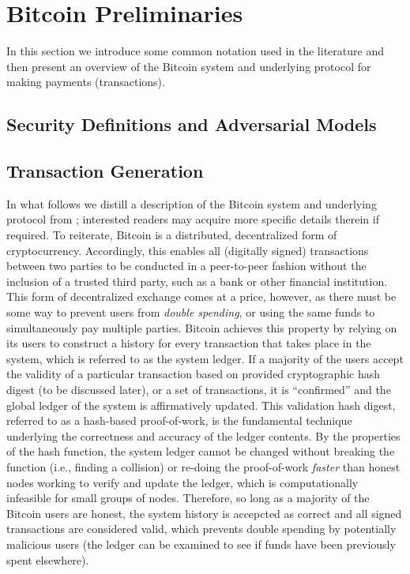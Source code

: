 \section{Bitcoin Preliminaries}

In this section we introduce some common notation used in the literature and then present an overview of the Bitcoin system and underlying protocol for making payments (transactions). 

\subsection{Security Definitions and Adversarial Models}

\subsection{Transaction Generation}

In what follows we distill a description of the Bitcoin system and underlying protocol from \cite{bitcoin}; interested readers may acquire more specific details therein if required. To reiterate, Bitcoin is a distributed, decentralized form of cryptocurrency. Accordingly, this enables all (digitally signed) transactions between two parties to be conducted in a peer-to-peer fashion without the inclusion of a trusted third party, such as a bank or other financial institution. This form of decentralized exchange comes at a price, however, as there must be some way to prevent users from \emph{double spending}, or using the same funds to simultaneously pay multiple parties. Bitcoin achieves this property by relying on its users to construct a history for every transaction that takes place in the system, which is referred to as the system ledger. If a majority of the users accept the validity of a particular transaction based on provided cryptographic hash digest (to be discussed later), or a set of transactions, it is ``confirmed'' and the global ledger of the system is affirmatively updated. This validation hash digest, referred to as a hash-based proof-of-work, is the fundamental technique underlying the correctness and accuracy of the ledger contents. By the properties of the hash function, the system ledger cannot be changed without breaking the function (i.e., finding a collision) or re-doing the proof-of-work \emph{faster} than honest nodes working to verify and update the ledger, which is computationally infeasible for small groups of nodes. Therefore, so long as a majority of the Bitcoin users are honest, the system history is accepcted as correct and all signed transactions are considered valid, which prevents double spending by potentially malicious users (the ledger can be examined to see if funds have been previously spent elsewhere). 

